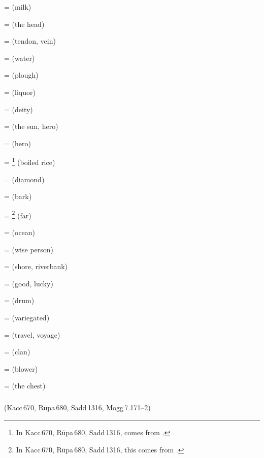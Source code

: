 =  (milk)\par
{} =  (the head)\par
{} =  (tendon, vein)\par
{} =  (water)\par
{} =  (plough)\par
{} =  (liquor)\par
{} =  (deity)\par
{} =  (the sun, hero)\par
{} =  (hero)\par
{} = \footnote{In Kacc\,670, R\=upa\,680, Sadd\,1316,  comes from .} (boiled rice)\par
{} =  (diamond)\par
{} =  (bark)\par
{} = \footnote{In Kacc\,670, R\=upa\,680, Sadd\,1316, this comes from .} (far)\par
{} =  (ocean)\par
{} =  (wise person)\par
{} =  (shore, riverbank)\par
{} =  (good, lucky)\par
{} =  (drum)\par
{} =  (variegated)\par
{} =  (travel, voyage)\par
{} =  (clan)\par
{} =  (blower)\par
{} =  (the chest)\par

\subparagraph*{} (Kacc\,670, R\=upa\,680, Sadd\,1316, Mogg\,7.171--2)\label{pacckx:uura}

